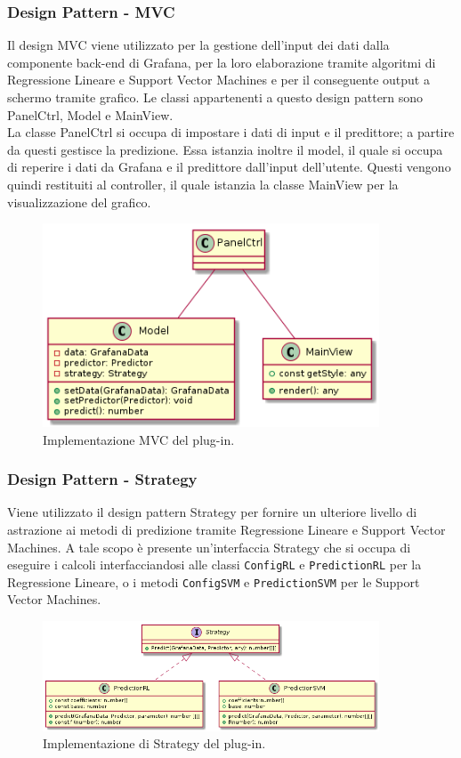 \documentclass[../manuale-sviluppatore.tex]{subfiles}
\begin{document}
\subsubsection{Design Pattern - MVC}
Il design MVC viene utilizzato per la gestione dell'input dei dati dalla componente back-end di Grafana, per la loro elaborazione tramite algoritmi di Regressione Lineare e Support Vector Machines e per il conseguente output a schermo tramite grafico. Le classi appartenenti a questo design pattern sono PanelCtrl, Model e MainView. \\
La classe PanelCtrl si occupa di impostare i dati di input e il predittore; a partire da questi gestisce la predizione. Essa istanzia inoltre il model, il quale si occupa di reperire i dati da Grafana e il predittore dall'input dell'utente. Questi vengono quindi restituiti al controller, il quale istanzia la classe MainView per la visualizzazione del grafico.

\begin{figure}[H]
  \centering
  \includegraphics[width=10cm]{img/plugin/mvcplugin.png}
  \caption{Implementazione MVC del plug-in.}
\end{figure}

\subsubsection{Design Pattern - Strategy}
Viene utilizzato il design pattern Strategy per fornire un ulteriore livello di astrazione ai metodi di predizione tramite Regressione Lineare e Support Vector Machines.
A tale scopo è presente un'interfaccia Strategy che si occupa di eseguire i calcoli interfacciandosi alle classi \texttt{ConfigRL} e \texttt{PredictionRL} per la Regressione Lineare,
o i metodi \texttt{ConfigSVM} e \texttt{PredictionSVM} per le Support Vector Machines. \\

\begin{figure}[H]
  \centering
  \includegraphics[width=10cm]{img/plugin/strategy.png}
  \caption{Implementazione di Strategy del plug-in.}
\end{figure}
\end{document}
